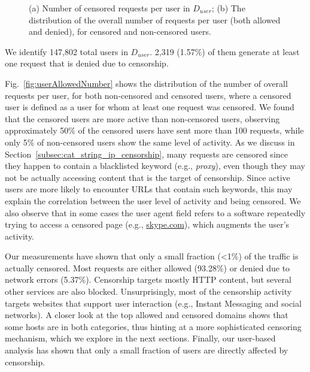 \documentclass{sig-alternate-2013}
\newcommand{\descr}[1]{\smallskip\noindent{\bf #1}}
\def\du{$D_{user}$\xspace}
\begin{document}
\begin{figure}[t!]
  \begin{center}
\vspace{-0.4cm}
\caption{(a) Number of censored requests per user in \du; (b) The distribution of the overall number of requests per user (both allowed and denied), for censored and non-censored users.}
        \vspace{-0.7cm}

\end{center}
\end{figure}



We identify 147,802 total users in \du. 2,319 (1.57\%) of them generate at least one request that is denied due to censorship. 



Fig.~\ref{fig:userAllowedNumber} shows the distribution of the number of overall requests per user, for both non-censored and censored users, where a censored user is defined as a user for whom at least one request was censored. We found that the censored users are more active than non-censored users, observing approximately 50\% of the censored users have sent more than 100 requests, while only 5\% of non-censored users show the same level of activity. As we discuss in Section~\ref{subsec:cat_string_ip_censorship}, many requests are censored since they happen to contain a blacklisted keyword (e.g., {\em proxy}), even though they may not be actually accessing content that is the target of censorship. Since active users are more likely to encounter URLs that contain such keywords, this may explain the correlation between the user level of activity and being censored. We also observe that in some cases the user agent field refers to a software repeatedly trying to access a censored page (e.g., \url{skype.com}), which augments the user's activity.


\descr{Summary.}
Our measurements have shown that only a small fraction (<1\%) of the traffic is actually censored. Most requests are either allowed (93.28\%) or denied due to network errors (5.37\%). Censorship targets mostly HTTP content, but several other services are also blocked. Unsurprisingly, most of the censorship activity targets websites that support user interaction (e.g., Instant Messaging and social networks). 
A closer look at the top allowed and censored domains shows that some hosts are in both categories, thus hinting at a more sophisticated censoring mechanism, which we explore in the next sections.
Finally, our user-based analysis has shown that only a small fraction of users are directly affected by censorship. 
\end{document}

